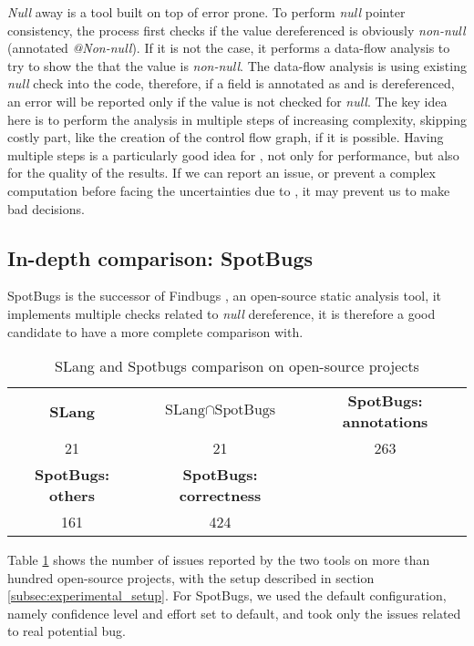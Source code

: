 \emph{Null} away is a tool built on top of error prone. 
To perform \emph{null} pointer consistency, the process first checks if the value dereferenced is obviously \emph{non-null} (annotated \emph{@Non-null}). 
If it is not the case, it performs a data-flow analysis to try to show the that the value is \emph{non-null}. 
The data-flow analysis is using existing \emph{null} check into the code, therefore, if a field is annotated as \nullable{} and is dereferenced, an error will be reported only if the value is not checked for \emph{null}. \newline
The key idea here is to perform the analysis in multiple steps of increasing complexity, skipping costly part, like the creation of the control flow graph, if it is possible.
Having multiple steps is a particularly good idea for \slang{}, not only for performance, but also for the quality of the results. 
If we can report an issue, or prevent a complex computation before facing the uncertainties due to \slang{}, it may prevent us to make bad decisions.

\subsection{In-depth comparison: SpotBugs}
\label{subsec:indpeth_comparison_spotbugs}

SpotBugs \cite{Spotbugs:2019:Online} is the successor of Findbugs \cite{FindBugs:2019:Online}, an open-source static analysis tool, it implements multiple checks related to \emph{null} dereference, it is therefore a good candidate to have a more complete comparison with.

\begin{table}[h]
	\centering
	\caption{SLang and Spotbugs comparison on open-source projects}
	\label{table:slang_vs_spotbugs}
	\begin{tabular}{|c|c|c|}
		\hline
		\bf SLang & \bf $\text{SLang} \cap \text{SpotBugs}$ & \bf SpotBugs: annotations \\
		21 & 21 & 263 \\ \hline
		\bf SpotBugs: others & \bf SpotBugs: correctness & \\ 
		161 & 424 &  \\ \hline
	\end{tabular}
\end{table}

Table \ref{table:slang_vs_spotbugs} shows the number of issues reported by the two tools on more than hundred open-source projects, with the setup described in section \ref{subsec:experimental_setup}. 
For SpotBugs, we used the default configuration, namely confidence level and effort set to default, and took only the issues related to real potential bug.

